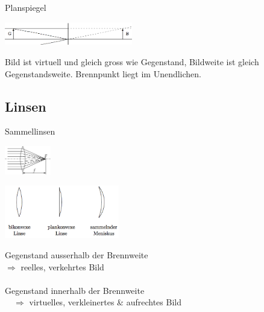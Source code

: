 \begin{minipage}[]{3.5cm}
  Planspiegel
\end{minipage}
\begin{minipage}[]{7cm}
  \includegraphics[height=1cm]{./bilder/Planspiegel.png}
\end{minipage}
\begin{minipage}[]{8cm}
  \small
  Bild ist virtuell und gleich gross wie Gegenstand, Bildweite ist gleich
  Gegenstandsweite. Brennpunkt liegt im Unendlichen.
\end{minipage}

\subsection{Linsen  }
\begin{minipage}[]{3.5cm}
  Sammellinsen
\end{minipage}
\begin{minipage}[]{2cm}
  \includegraphics[width=2cm]{./bilder/sammelprinzip.png}
\end{minipage}
\begin{minipage}[]{5cm}
  \includegraphics[width=5cm]{./bilder/sammellinsen.png}
\end{minipage}
\begin{minipage}[]{7.5cm}
  \small
  Gegenstand ausserhalb der Brennweite \\
  $\Rightarrow$ reelles, verkehrtes Bild \\ \\
  Gegenstand innerhalb der Brennweite \\
  $\quad \Rightarrow$ virtuelles, verkleinertes \& aufrechtes Bild
\end{minipage}

